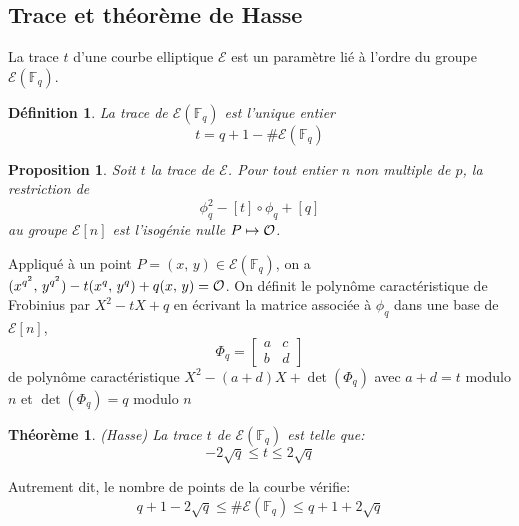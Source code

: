 \documentclass[letterpaper, 12pt]{article}
\newtheorem{prop}{Proposition}
\newtheorem{theo}{Théorème}
\newtheorem{defi}{Définition}
\newcommand{\F}{\mathbb{F}_q}
\newcommand{\E}{\mathcal{E}}
\begin{document}
    \subsection{Trace et théorème de Hasse}
La trace $t$ d'une courbe elliptique $\E$ est un paramètre lié à l'ordre du groupe $\E(\F)$.
\begin{defi}
    La trace de $\E(\F)$ est l'unique entier $$t = q+1-\#\E(\F)$$
\end{defi}

\begin{prop}
    Soit $t$ la trace de $\E$. Pour tout entier $n$ non multiple de $p$, la restriction de
    $$\phi_q ^2 -[t]\circ\phi_q + [q]$$
    au groupe $\E[n]$ est l'isogénie nulle $P\mapsto \cal O$.
\end{prop}
Appliqué à un point $P=(x,\,y)\in\E(\F)$, on a $(x^{q^2},\,y^{q^2}) -t(x^q,\,y^q) + q(x,\,y)=\cal O$.
\newline
On définit le polynôme caractéristique de Frobinius par $X^2-tX+q$ en écrivant la matrice associée à $\phi_q$ dans une base de $\E[n]$,
\[
\Phi_q=
  \begin{bmatrix}
    a & c \\
    b & d
  \end{bmatrix}
\]
de polynôme caractéristique $X^2-(a+d)X+\det(\Phi_q)$ avec $a+d = t$ modulo $n$ et $\det(\Phi_q)=q$ modulo $n$

\begin{theo}(Hasse)
\newline
    La trace $t$ de $\E(\F)$ est telle que: $$-2\sqrt{q}\leq t \leq 2\sqrt{q}$$
\end{theo}
Autrement dit, le nombre de points de la courbe vérifie: $$q+1-2\sqrt{q}\leq \#\E(\F) \leq q+1+2\sqrt{q}$$
\end{document}

